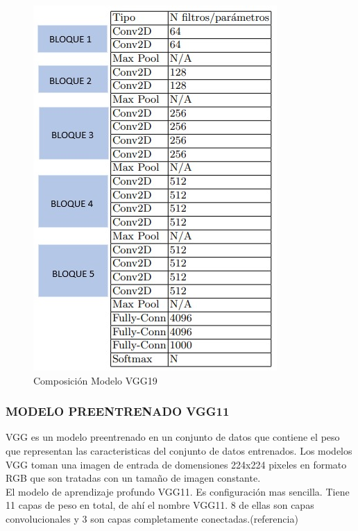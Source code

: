 				\begin{figure}[ht]
					\centering
					\includegraphics[scale=0.55]{Figs/21.jpeg}
					\caption{Composición Modelo VGG19}
					\label{fig:VGG19_tabla}
				\end{figure}

\newpage
			\subsubsection{\MakeUppercase{Modelo preentrenado VGG11}}
			VGG es un modelo preentrenado en un conjunto de datos que contiene el peso que representan las caracteristicas del conjunto de datos entrenados. Los modelos VGG toman una imagen de entrada de domensiones 224x224 pixeles en formato RGB que son tratadas con un tamaño de imagen constante.
			\\
			 El modelo de aprendizaje profundo VGG11. Es configuración mas sencilla. Tiene 11 capas de peso en total, de ahí el nombre VGG11. 8 de ellas son capas convolucionales y 3 son capas completamente conectadas.(referencia)
			
